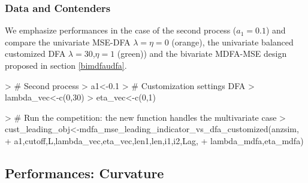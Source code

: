 \documentclass[a4paper]{book}
\begin{document}
\subsubsection{Data and Contenders}

We emphasize performances in the case of the second process ($a_1=0.1$) and compare the univariate MSE-DFA $\lambda=\eta=0$ (orange), the univariate balanced customized DFA $\lambda=30$,$\eta=1$ (green)) and the bivariate MDFA-MSE design proposed in section \ref{bimdfaudfa}.
\begin{Schunk}
\begin{Sinput}
> # Second process
> a1<-0.1
> # Customization settings DFA
> lambda_vec<-c(0,30)
> eta_vec<-c(0,1)
\end{Sinput}
\end{Schunk}
\begin{Schunk}
\begin{Sinput}
> # Run the competition: the new function handles the multivariate case
> cust_leading_obj<-mdfa_mse_leading_indicator_vs_dfa_customized(anzsim,
+                   a1,cutoff,L,lambda_vec,eta_vec,len1,len,i1,i2,Lag,
+                   lambda_mdfa,eta_mdfa)  
\end{Sinput}
\end{Schunk}



\subsection{Performances: Curvature}
\end{document}
